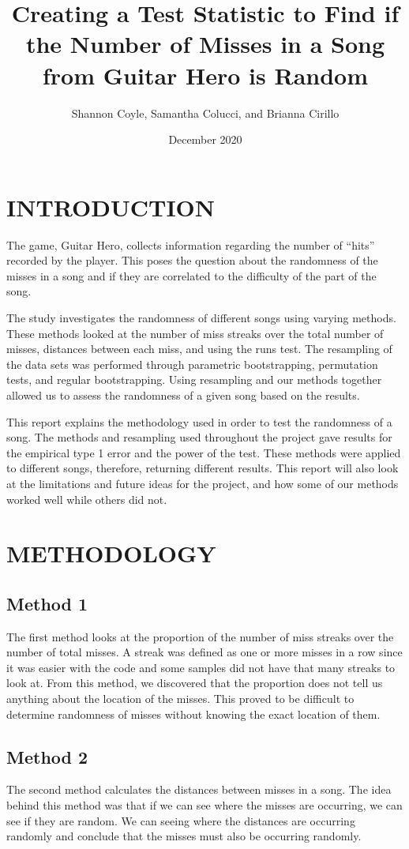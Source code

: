 \documentclass[12pt, letterpaper]{article}
\title{Creating a Test Statistic to Find if the Number of Misses in a Song from Guitar Hero is Random}
\author{Shannon Coyle, Samantha Colucci, and Brianna Cirillo}
\date{December 2020}
\begin{document}
\maketitle

\section{INTRODUCTION}
The game, Guitar Hero, collects information regarding the number of “hits” recorded by the player.  This poses the question about the randomness of the misses in a song and if they are correlated to the difficulty of the part of the song.

The study investigates the randomness of different songs using varying methods.  These methods looked at the number of miss streaks over the total number of misses, distances between each miss, and using the runs test.  The resampling of the data sets was performed through parametric bootstrapping, permutation tests, and regular bootstrapping. Using resampling and our methods together allowed us to assess the randomness of a given song based on the results. 

This report explains the methodology used in order to test the randomness of a song. The methods and resampling used throughout the project gave results for the empirical type 1 error and the power of the test. These methods were applied to different songs, therefore, returning different results. This report will also look at the limitations and future ideas for the project, and how some of our methods worked well while others did not.

\section{METHODOLOGY}
\subsection{Method 1}
The first method looks at the proportion of the number of miss streaks over the number of total misses.  A streak was defined as one or more misses in a row since it was easier with the code and some samples did not have that many streaks to look at.  From this method, we discovered that the proportion does not tell us anything about the location of the misses.  This proved to be difficult to determine randomness of misses without knowing the exact location of them.  

\subsection{Method 2}
The second method calculates the distances between misses in a song.  The idea behind this method was that if we can see where the misses are occurring, we can see if they are random.  We can seeing where the distances are occurring randomly and conclude that the misses must also be occurring randomly. 
\end{document}
